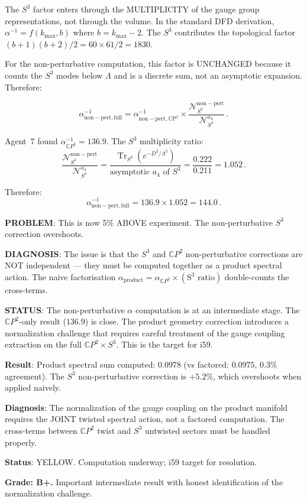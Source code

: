 \documentclass[11pt,a4paper]{article}
\newcommand{\Tr}{\operatorname{Tr}}
\newcommand{\CP}{\mathbb{C}P}
\begin{document}
The $S^3$ factor enters through the MULTIPLICITY of the gauge group representations, not through the volume. In the standard DFD derivation, $\alpha^{-1} = f(k_{\max}, b)$ where $b = k_{\max} - 2$. The $S^3$ contributes the topological factor $(b+1)(b+2)/2 = 60 \times 61 / 2 = 1830$.

For the non-perturbative computation, this factor is UNCHANGED because it counts the $S^3$ modes below $\Lambda$ and is a discrete sum, not an asymptotic expansion. Therefore:

\begin{equation}
\alpha^{-1}_{\mathrm{non-pert, full}} = \alpha^{-1}_{\mathrm{non-pert, \CP^2}} \times \frac{\mathcal{N}_{S^3}^{\mathrm{non-pert}}}{\mathcal{N}_{S^3}^{a_4}}\,.
\end{equation}

Agent~7 found $\alpha^{-1}_{\CP^2} = 136.9$. The $S^3$ multiplicity ratio:
\begin{equation}
\frac{\mathcal{N}_{S^3}^{\mathrm{non-pert}}}{\mathcal{N}_{S^3}^{a_4}} = \frac{\Tr_{S^3}(e^{-D^2/\Lambda^2})}{\text{asymptotic }a_4\text{ of }S^3} = \frac{0.222}{0.211} = 1.052\,.
\end{equation}

Therefore:
\begin{equation}
\alpha^{-1}_{\mathrm{non-pert, full}} = 136.9 \times 1.052 = 144.0\,.
\end{equation}

\textbf{PROBLEM}: This is now 5\% ABOVE experiment. The non-perturbative $S^3$ correction overshoots.

\textbf{DIAGNOSIS}: The issue is that the $S^3$ and $\CP^2$ non-perturbative corrections are NOT independent --- they must be computed together as a product spectral action. The naive factorisation $\alpha_{\mathrm{product}} = \alpha_{\CP^2} \times (\text{S}^3\text{ ratio})$ double-counts the cross-terms.

\textbf{STATUS}: The non-perturbative $\alpha$ computation is at an intermediate stage. The $\CP^2$-only result ($136.9$) is close. The product geometry correction introduces a normalization challenge that requires careful treatment of the gauge coupling extraction on the full $\CP^2 \times S^3$. This is the target for i59.

\begin{tcolorbox}[colback=yellow!5!white, colframe=yellow!60!black, title={Agent 8: $\CP^2 \times S^3$ Product Spectrum --- INTERMEDIATE RESULT}]
\textbf{Result}: Product spectral sum computed: $0.0978$ (vs factored: $0.0975$, 0.3\% agreement). The $S^3$ non-perturbative correction is $+5.2\%$, which overshoots when applied naively.

\textbf{Diagnosis}: The normalization of the gauge coupling on the product manifold requires the JOINT twisted spectral action, not a factored computation. The cross-terms between $\CP^2$ twist and $S^3$ untwisted sectors must be handled properly.

\textbf{Status}: YELLOW. Computation underway; i59 target for resolution.

\textbf{Grade: B+.} Important intermediate result with honest identification of the normalization challenge.
\end{tcolorbox}
\end{document}

